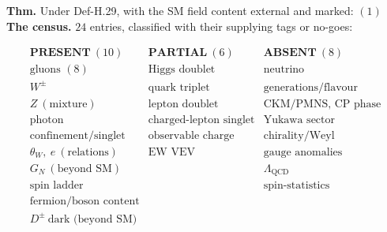 \begin{theorem}\label{tag:FT-81}
\textbf{Thm.} Under Def-H.29, with the SM field content external and marked: $(1)$ \textbf{The census.} $24$ entries, classified with their supplying tags or no-goes:

\[
\begin{array}{lll}
\textbf{PRESENT}\ (10) & \textbf{PARTIAL}\ (6) & \textbf{ABSENT}\ (8)\\
\hline
\text{gluons }(8) & \text{Higgs doublet} & \text{neutrino}\\
W^\pm & \text{quark triplet} & \text{generations/flavour}\\
Z\ (\text{mixture}) & \text{lepton doublet} & \text{CKM/PMNS, CP phase}\\
\text{photon} & \text{charged-lepton singlet} & \text{Yukawa sector}\\
\text{confinement/singlet} & \text{observable charge} & \text{chirality/Weyl}\\
\theta_W,\ e\ (\text{relations}) & \text{EW VEV} & \text{gauge anomalies}\\
G_N\ (\text{beyond SM}) & & \Lambda_{\mathrm{QCD}}\\
\text{spin ladder} & & \text{spin-statistics}\\
\text{fermion/boson content} & & \\
D^\pm\ \text{dark (beyond SM)} & &
\end{array}
\]


\end{theorem}
